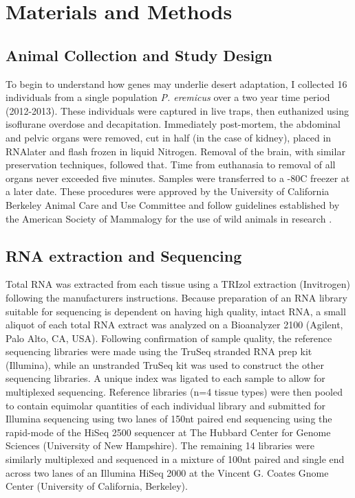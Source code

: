 \documentclass[11pt]{article}
\begin{document}
\section*{Materials and Methods}

\subsection*{Animal Collection and Study Design}

To begin to understand how genes may underlie desert adaptation, I collected 16 individuals from a single population \textit{P. eremicus} over a two year time period (2012-2013). These individuals were captured in live traps, then euthanized using isoflurane overdose and decapitation. Immediately post-mortem, the abdominal and pelvic organs were removed, cut in half (in the case of kidney), placed in RNAlater and flash frozen in liquid Nitrogen. Removal of the brain, with similar preservation techniques, followed that. Time from euthanasia to removal of all organs never exceeded five minutes. Samples were transferred to a -80C freezer at a later date. These procedures were approved by the University of California Berkeley Animal Care and Use Committee and follow guidelines established by the American Society of Mammalogy for the use of wild animals in research \cite{Sikes:2011dz}.  

\subsection*{RNA extraction and Sequencing}

Total RNA was extracted from each tissue using a TRIzol extraction (Invitrogen) following the manufacturers instructions. Because preparation of an RNA library suitable for sequencing is dependent on having high
quality, intact RNA, a small aliquot of each total RNA extract was
analyzed on a Bioanalyzer 2100 (Agilent, Palo Alto, CA, USA).
Following confirmation of sample quality, the reference sequencing libraries
were made using the TruSeq stranded RNA prep kit
(Illumina), while an unstranded TruSeq kit was used to construct the other sequencing libraries. A unique index was ligated to each sample to allow for multiplexed sequencing. Reference libraries (n=4 tissue types) were then pooled to
contain equimolar quantities of each individual library and
submitted for Illumina sequencing using two lanes of 150nt paired end sequencing using the rapid-mode of the HiSeq 2500 sequencer at The Hubbard Center for Genome Sciences (University of New Hampshire). The remaining 14 libraries were similarly multiplexed and sequenced in a mixture of 100nt paired and single end across two lanes of an Illumina HiSeq 2000 at the Vincent G. Coates Gnome Center (University of California, Berkeley).
\end{document}
